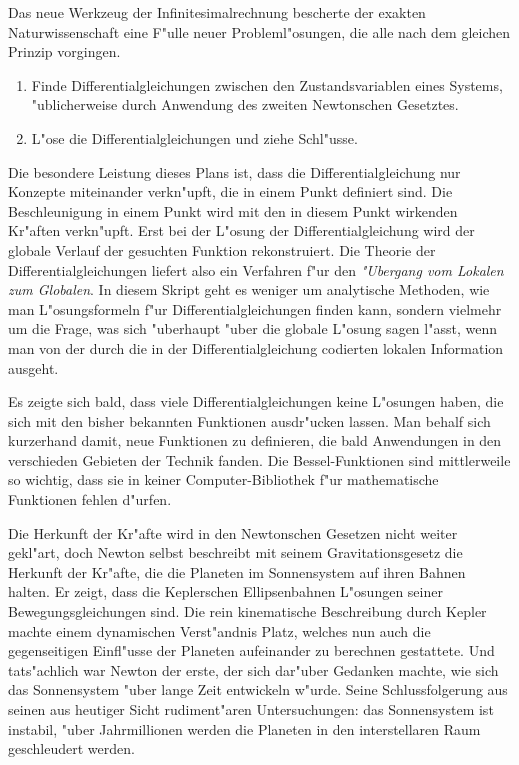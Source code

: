 Das neue Werkzeug der Infinitesimalrechnung bescherte der exakten
Naturwissenschaft eine F"ulle neuer Probleml"osungen, die alle
nach dem gleichen Prinzip vorgingen.
\begin{enumerate}
\item
Finde Differentialgleichungen zwischen den Zustandsvariablen
eines Systems, "ublicherweise durch Anwendung des zweiten
Newtonschen Gesetztes.
\item
L"ose die Differentialgleichungen und
ziehe Schl"usse.
\end{enumerate}
Die besondere Leistung dieses Plans ist, dass die Differentialgleichung
nur Konzepte miteinander verkn"upft, die in einem Punkt definiert sind.
Die Beschleunigung in einem Punkt wird mit den in diesem Punkt wirkenden
Kr"aften verkn"upft.
Erst bei der L"osung der Differentialgleichung wird der globale Verlauf
der gesuchten Funktion rekonstruiert.
Die Theorie der Differentialgleichungen liefert also ein Verfahren
f"ur den {\em "Ubergang vom Lokalen zum Globalen}.
In diesem Skript geht es weniger um analytische Methoden, wie man
L"osungsformeln f"ur Differentialgleichungen finden kann, sondern
vielmehr um die Frage, was sich "uberhaupt "uber die globale L"osung
sagen l"asst, wenn man von der durch die in der Differentialgleichung 
codierten lokalen Information ausgeht.

Es zeigte sich bald, dass viele Differentialgleichungen
keine L"osungen haben, die sich mit den bisher bekannten Funktionen
ausdr"ucken lassen.
Man behalf sich kurzerhand damit, neue Funktionen zu definieren, 
die bald Anwendungen in den verschieden Gebieten der Technik fanden.
Die Bessel-Funktionen sind mittlerweile so wichtig, dass sie in keiner
Computer-Bibliothek f"ur mathematische Funktionen fehlen d"urfen.
%

Die Herkunft der Kr"afte wird in den Newtonschen Gesetzen nicht weiter
gekl"art, doch Newton selbst beschreibt mit seinem Gravitationsgesetz
die Herkunft der Kr"afte, die die Planeten im Sonnensystem auf ihren Bahnen
halten.
%
%
%
%
Er zeigt, dass die Keplerschen Ellipsenbahnen L"osungen seiner
Bewegungsgleichungen sind.
Die rein kinematische Beschreibung durch Kepler machte einem
dynamischen Verst"andnis Platz, welches nun auch die gegenseitigen
Einfl"usse der Planeten aufeinander zu berechnen gestattete.
Und tats"achlich war Newton der erste, der sich dar"uber Gedanken
machte, wie sich das Sonnensystem "uber lange Zeit entwickeln w"urde.
Seine Schlussfolgerung aus seinen aus heutiger Sicht rudiment"aren
Untersuchungen: das Sonnensystem ist instabil, "uber Jahrmillionen 
werden die Planeten in den interstellaren Raum geschleudert werden.

